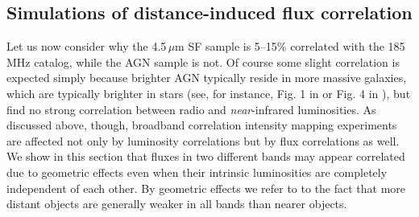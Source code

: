 \documentclass[numberedappendix]{emulateapj}
\begin{document}
\subsection{Simulations of distance-induced flux correlation}
\label{sec:fluxcorsims}
Let us now consider why the 4.5\,$\mu$m SF sample is 5--15\% correlated with the 185\,MHz catalog, while the AGN sample is not. Of course some slight correlation is expected simply because brighter AGN typically reside in more massive galaxies, which are typically brighter in stars (see, for instance, Fig. 1 in \citep{seymour07} or Fig. 4 in \citep{Willott03}), but \citet{mauch07} find no strong correlation between radio and \textit{near}-infrared luminosities. As discussed above, though, broadband correlation intensity mapping experiments are affected not only by luminosity correlations but by flux correlations as well. We show in this section that fluxes in two different bands may appear correlated due to geometric effects even when their intrinsic luminosities are completely independent of each other. By geometric effects we refer to to the fact that more distant objects are generally weaker in all bands than nearer objects. 
\end{document}
